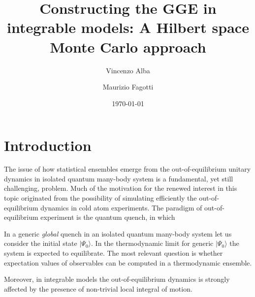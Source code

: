\documentclass[twocolumn,superscriptaddress,prb,10pt]{revtex4-1}
\begin{document}
\title{Constructing the GGE in integrable models: A Hilbert space Monte Carlo 
approach} 

\author{Vincenzo Alba}

\author{Maurizio Fagotti}

\date{\today}




\begin{abstract} 


\end{abstract}


\maketitle


\section{Introduction}

The issue of how statistical ensembles emerge from the out-of-equilibrium 
unitary dynamics in isolated quantum many-body system is a fundamental, 
yet still challenging, problem. Much of the motivation for the renewed 
interest in this topic originated from the possibility of simulating 
efficiently the out-of-equilibrium dynamics in cold atom experiments. 
The paradigm of out-of-equilibrium experiment is the quantum quench, in 
which 



In a generic {\it global} quench in an isolated quantum many-body system let 
us consider the initial state $|\Psi_0\rangle$. In the thermodynamic limit for 
generic $|\Psi_0\rangle$ the system is expected to equilibrate. The most 
relevant question is whether expectation values of observables can be 
computed in a thermodynamic ensemble. 

Moreover, in integrable models the out-of-equilibrium dynamics is strongly  
affected by the presence of non-trivial local integral of motion. 
\end{document}
